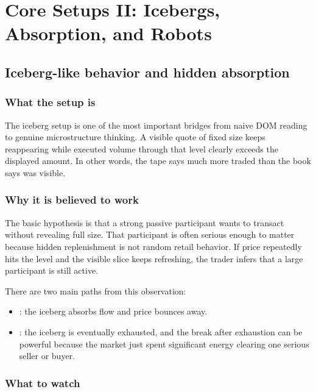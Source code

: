 \section{Core Setups II: Icebergs, Absorption, and Robots}

\subsection{Iceberg-like behavior and hidden absorption}

\subsubsection{What the setup is}

The iceberg setup is one of the most important bridges from naive DOM reading to genuine
microstructure thinking. A visible quote of fixed size keeps reappearing while executed volume
through that level clearly exceeds the displayed amount. In other words, the tape says much
more traded than the book says was visible.

\subsubsection{Why it is believed to work}

The basic hypothesis is that a strong passive participant wants to transact without revealing
full size. That participant is often serious enough to matter because hidden replenishment is
not random retail behavior. If price repeatedly hits the level and the visible slice keeps
refreshing, the trader infers that a large participant is still active.

There are two main paths from this observation:

\begin{itemize}[leftmargin=1.4em]
  \item {}: the iceberg absorbs flow and price bounces away.
  \item {}: the iceberg is eventually exhausted, and the break after exhaustion can
        be powerful because the market just spent significant energy clearing one serious seller
        or buyer.
\end{itemize}

\subsubsection{What to watch}

